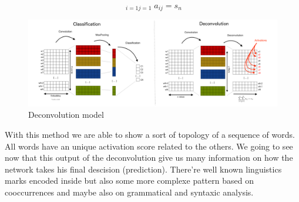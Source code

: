 \begin{equation}
\mathop{\sum^{x}\sum^{y}}_{i=1  j=1}  a_{ij} = s_{n}
\label{equation}
\end{equation}

\begin{figure}[h]
\begin{center}
\includegraphics[width=16cm]{img/model.png}
\caption{Deconvolution model}
\label{cnn}
\end{center}
\end{figure}

With this method we are able to show a sort of topology of a sequence of words. All words have an unique activation score related to the others. We going to see now that this output of the deconvolution give us many information on how the network takes his final descision (prediction). There're well known linguistics marks encoded inside but also some more complexe pattern based on cooccurrences and maybe also on grammatical and syntaxic analysis.
